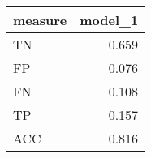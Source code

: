 \begin{tabular}{lr}
\toprule
measure &  model\_1 \\
\midrule
     TN &    0.659 \\
     FP &    0.076 \\
     FN &    0.108 \\
     TP &    0.157 \\
    ACC &    0.816 \\
\bottomrule
\end{tabular}
